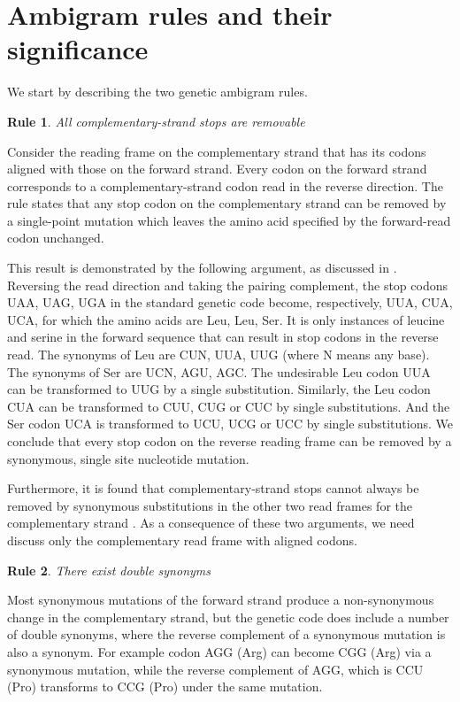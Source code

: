 \documentclass[unnumsec,webpdf,contemporary,large,namedate]{oup-authoring-template}%
\theoremstyle{thmstyleone}%
\newtheorem{ambirule}{Rule}%
\theoremstyle{thmstyletwo}%
\theoremstyle{thmstylethree}%
\begin{document}
\section{Ambigram rules and their significance}
\label{sec: 2}

We start by describing the two genetic ambigram rules.

\begin{ambirule}All complementary-strand stops are removable \label{rule1}
\end{ambirule}

Consider the reading frame on the complementary strand that has its
codons aligned with those on the forward strand. Every codon on the forward
strand corresponds to a complementary-strand codon read in the reverse
direction. The rule states that any stop codon on the complementary strand
can be removed by a single-point mutation which leaves the amino acid specified by the
forward-read codon unchanged.

This result is demonstrated by the following argument, as discussed in \cite{DeR+19}. Reversing the read direction
and taking the pairing complement, the stop codons UAA, UAG, UGA in the standard genetic code become, respectively,
UUA, CUA, UCA, for which the amino acids are Leu, Leu, Ser. It is only instances of leucine and
serine in the forward sequence that can result in stop codons in the reverse read.
The synonyms of Leu are  CUN,  UUA, UUG (where N means any base).
The synonyms of Ser are UCN, AGU, AGC. The undesirable Leu codon UUA can be transformed
to UUG by a single substitution. Similarly, the Leu codon CUA can be transformed to
CUU, CUG or CUC by single substitutions. And the Ser codon UCA is transformed to UCU, UCG or UCC
by single substitutions. We conclude that every stop codon on the reverse reading frame can be removed
by a synonymous, single site nucleotide mutation.

Furthermore, it is found that complementary-strand stops cannot always be removed by synonymous substitutions
in the other two read frames for the complementary strand \citep[each case requires a separate and somewhat
involved argument, also given in][]{DeR+19}. As a consequence of these two arguments, we need discuss only the
complementary read frame with aligned codons.

\begin{ambirule}There exist double synonyms\label{rule2}
\end{ambirule}

Most synonymous mutations of the forward strand produce a non-synonymous change in the
complementary strand, but the genetic code does include a number of double synonyms,
where the reverse complement of a synonymous mutation is also a synonym.
For example codon AGG (Arg) can become CGG (Arg) via a synonymous mutation,
while the reverse complement of AGG, which is CCU (Pro) transforms to CCG (Pro) under
the same mutation.
\end{document}
